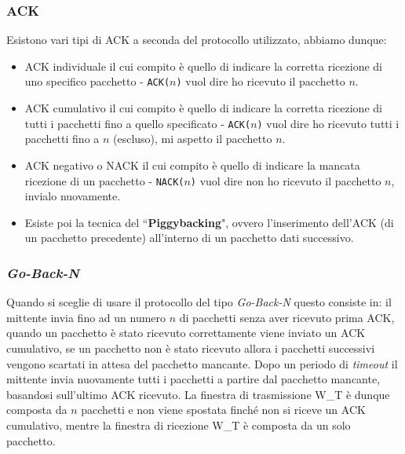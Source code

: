         \subsubsection[ACKnowledgment (\Acrshort*{ACK})]{\Acrfull*{ACK}}
            Esistono vari tipi di \Acrshort*{ACK} a seconda del protocollo utilizzato, abbiamo dunque:
            \begin{itemize}
                \item \Acrshort*{ACK} individuale il cui compito è quello di indicare la corretta ricezione di uno specifico pacchetto - \texttt{ACK($n$)} vuol dire ho ricevuto il pacchetto $n$.
                \item \Acrshort*{ACK} cumulativo il cui compito è quello di indicare la corretta ricezione di tutti i pacchetti fino a quello specificato - \texttt{ACK($n$)} vuol dire ho ricevuto tutti i pacchetti fino a $n$ (escluso), mi aspetto il pacchetto $n$.
                \item \Acrshort*{ACK} negativo o \Acrshort*{NACK} il cui compito è quello di indicare la mancata ricezione di un pacchetto - \texttt{NACK($n$)} vuol dire non ho ricevuto il pacchetto $n$, invialo nuovamente.
                \item Esiste poi la tecnica del ``\textbf{Piggybacking}", ovvero l'inserimento dell'\Acrshort*{ACK} (di un pacchetto precedente) all'interno di un pacchetto dati successivo.
            \end{itemize}
        \subsubsection{\textit{Go-Back-N}}
            Quando si sceglie di usare il protocollo del tipo \textit{Go-Back-N} questo consiste in: il mittente invia fino ad un numero $ n $ di pacchetti senza aver ricevuto prima \Acrshort*{ACK}, quando un pacchetto è stato ricevuto correttamente viene inviato un \Acrshort*{ACK} cumulativo, se un pacchetto non è stato ricevuto allora i pacchetti successivi vengono scartati in attesa del pacchetto mancante. Dopo un periodo di \textit{timeout} il mittente invia nuovamente tutti i pacchetti a partire dal pacchetto mancante, basandosi sull'ultimo \Acrshort*{ACK} ricevuto. La finestra di trasmissione \Acrshort*{W_T} è dunque composta da $ n $ pacchetti e non viene spostata finché non si riceve un \Acrshort*{ACK} cumulativo, mentre la finestra di ricezione \Acrshort*{W_T} è composta da un solo pacchetto.
